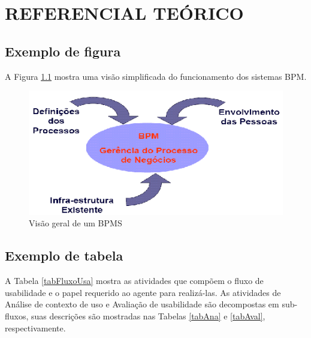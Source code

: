 
\chapter{REFERENCIAL TEÓRICO}


\section{Exemplo de figura}
 
    A Figura \ref{estruturaBPM}  mostra uma visão simplificada do funcionamento dos sistemas BPM.
    \begin{figure}[H]
        \centering
        \includegraphics[scale=0.6,angle=0]{img/EstruturaBPM.png}
        \caption{Visão geral de um BPMS}
        \label{estruturaBPM}
    \end{figure}

\section{Exemplo de tabela}

	A Tabela \ref{tabFluxoUsa} mostra as atividades que compõem o fluxo de usabilidade e o papel requerido ao agente para realizá-las. As atividades de Análise de contexto de uso e Avaliação de usabilidade são decompostas em sub-fluxos, suas descrições são mostradas nas Tabelas \ref{tabAna} e \ref{tabAval}, respectivamente.

